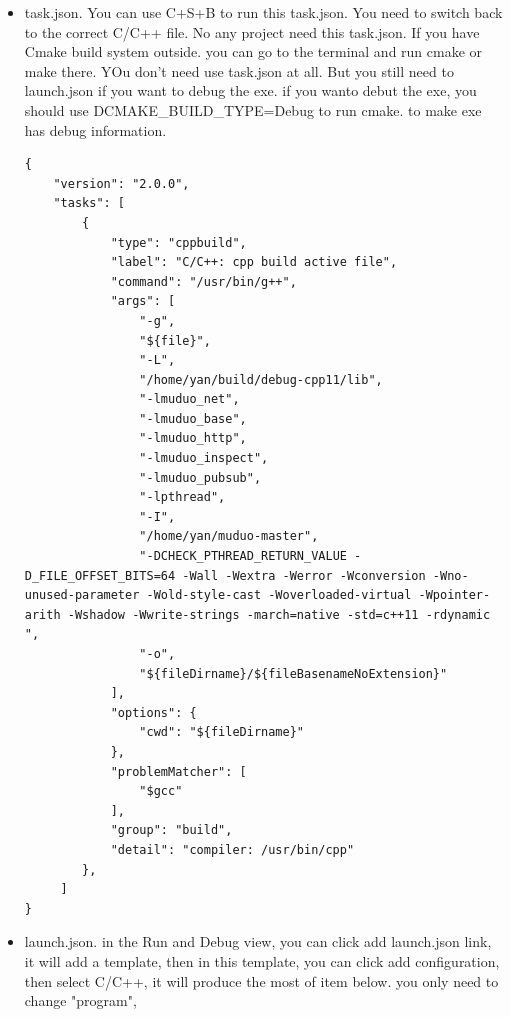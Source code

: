 \documentclass[a4paper,11pt,twoside]{book}
\begin{document}
\begin{itemize}
\item task.json. You can use C+S+B to run this task.json. You need to switch back to the correct C/C++ file. No any project need this task.json. If you have Cmake build system outside. you can go to the terminal and run cmake or make there. YOu don't need use task.json at all.  But you still need to launch.json if you want to debug the exe. if you wanto debut the exe, you should use DCMAKE\_BUILD\_TYPE=Debug to run cmake. to make exe has debug information. 

\begin{lstlisting}[mathescape=false]
{
    "version": "2.0.0",
    "tasks": [
        {
            "type": "cppbuild",
            "label": "C/C++: cpp build active file",
            "command": "/usr/bin/g++",
            "args": [
                "-g",
                "${file}",
                "-L",
                "/home/yan/build/debug-cpp11/lib",
                "-lmuduo_net",
                "-lmuduo_base",
                "-lmuduo_http",
                "-lmuduo_inspect",
                "-lmuduo_pubsub",
                "-lpthread",
                "-I",
                "/home/yan/muduo-master",
                "-DCHECK_PTHREAD_RETURN_VALUE -D_FILE_OFFSET_BITS=64 -Wall -Wextra -Werror -Wconversion -Wno-unused-parameter -Wold-style-cast -Woverloaded-virtual -Wpointer-arith -Wshadow -Wwrite-strings -march=native -std=c++11 -rdynamic ",
                "-o",
                "${fileDirname}/${fileBasenameNoExtension}"
            ],
            "options": {
                "cwd": "${fileDirname}"
            },
            "problemMatcher": [
                "$gcc"
            ],
            "group": "build",
            "detail": "compiler: /usr/bin/cpp"
        },
     ]
}
\end{lstlisting}

\item launch.json.  in the Run and Debug view, you can click add launch.json link, it will add a template, then in this template, you can click add configuration, then select C/C++, it will produce the most of item below. you only need to change "program", 


\end{itemize}
\end{document}
